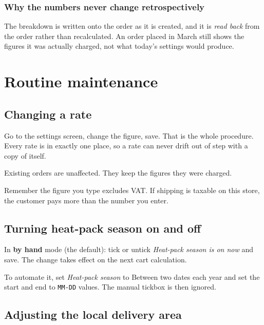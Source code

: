 \documentclass[11pt,a4paper,oneside]{report}
\newcommand{\opt}[1]{\texttt{\small #1}}
\begin{document}
\subsection{Why the numbers never change retrospectively}

The breakdown is written onto the order as it is created, and it is \emph{read back}
from the order rather than recalculated. An order placed in March still shows the
figures it was actually charged, not what today's settings would produce.

\chapter{Routine maintenance}
\label{ch:maintenance}

\section{Changing a rate}

Go to the settings screen, change the figure, save. That is the whole procedure.
Every rate is in exactly one place, so a rate can never drift out of step with a copy
of itself.

Existing orders are unaffected. They keep the figures they were charged.

\begin{housewarn}
Remember the figure you type excludes VAT. If shipping is taxable on this store, the
customer pays more than the number you enter.
\end{housewarn}

\section{Turning heat-pack season on and off}

In \textbf{by hand} mode (the default): tick or untick \emph{Heat-pack season is on
now} and save. The change takes effect on the next cart calculation.

To automate it, set \emph{Heat-pack season} to \textsf{Between two dates each year}
and set the start and end to \opt{MM-DD} values. The manual tickbox is then ignored.

\section{Adjusting the local delivery area}
\end{document}
